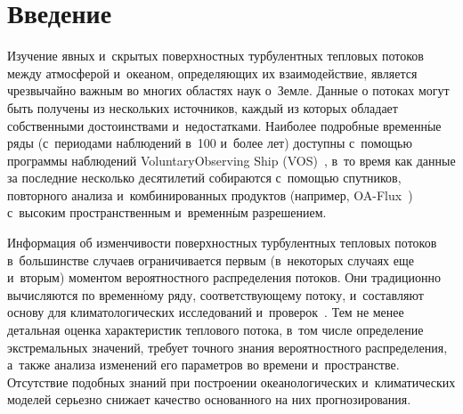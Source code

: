 




\thispagestyle{headings}

\begin{multicols}{2}

\label{st\stat}

\section{Введение}

Изучение явных и~скрытых поверхностных турбулентных тепловых
потоков между атмосферой и~океаном, определяющих их
взаимодействие, является чрезвычайно важным во многих областях
наук о~Земле. Данные о потоках могут быть получены из нескольких
источников, каждый из которых обладает собственными
достоинствами и~недостатками. Наиболее подробные временн$\acute{\mbox{ы}}$е
ряды (с~периодами  наблюдений в~100 и~более лет)  доступны\linebreak 
с~по\-мощью программы наблюдений Voluntary\linebreak Observing Ship
(VOS)~\cite{Berry2009}, в~то время как данные за последние несколько
десятилетий собираются с~помощью спутников, повторного анализа 
и~комбинированных продуктов (например,
OA-Flux~\cite{Yu2007a,Yu2007b}) с~высоким пространственным 
и~временн$\acute{\mbox{ы}}$м разрешением.

Информация об изменчивости поверхностных турбулентных тепловых
потоков в~большинстве случаев ограничивается первым (в~некоторых\linebreak
случаях еще и~вторым) моментом вероятностного распределения
потоков. Они традиционно вы\-чис\-ля\-ются по временн$\acute{\mbox{о}}$му ряду,
соответствующему потоку, и~составляют основу для
климатологических исследований и~проверок~\cite{Josey2001,Bouras2006}. 
Тем не менее детальная
оценка характеристик теплового потока, в~том числе определение
экстремальных значений, требует точного знания вероятностного
распределения, а~также анализа изменений его параметров во
времени и~пространстве. Отсутствие подобных знаний при построении
океанологических и~климатических моделей серьезно снижает
качество основанного на них прогнозирования.

\begin{figure*}[b] %
         \vspace*{-5pt}
 \begin{center}
 \mbox{%
 \epsfxsize=162.281mm
 }
 \end{center}
 \vspace*{-11pt}
\end{figure*}


\end{multicols}
